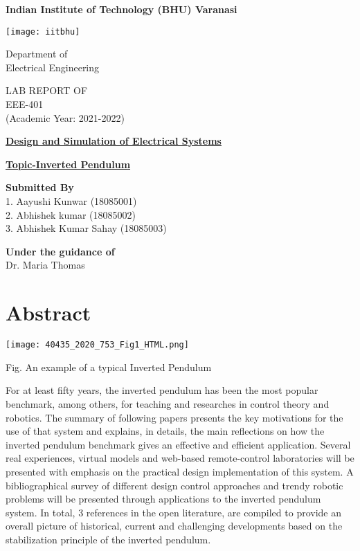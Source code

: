 \documentclass[11pt]{article}
\begin{document}
\begin{center}
{\huge \textbf{Indian Institute of Technology (BHU) Varanasi}}
\end{center}
\begin{center}
\texttt{[image: iitbhu]}
\end{center}
\begin{center}
{\LARGE Department of\\
Electrical Engineering\\
}
\end{center}
\begin{center}
    {\large LAB REPORT OF\\
    EEE-401\\ 
    (Academic Year: 2021-2022)\\}
\end{center}

\begin{center}
\textbf{\underline{Design and Simulation of Electrical Systems}}
\end{center}
\begin{center}
\textbf{\underline{Topic-Inverted Pendulum}}
\end{center}
\begin{center}
    \textbf{Submitted By}\\
    1. Aayushi Kunwar (18085001)\\
    2. Abhishek kumar (18085002)\\
    3. Abhishek Kumar Sahay (18085003)\\
\end{center}
\begin{center}
    \textbf{Under the guidance of}\\
    Dr. Maria Thomas
\end{center}

\newpage
\section{Abstract}
\begin{center}
    \texttt{[image: 40435\_2020\_753\_Fig1\_HTML.png]}
\end{center}
\begin{center}
    Fig. An example of a typical Inverted Pendulum
\end{center}
{For at least fifty years, the inverted pendulum has been the most popular benchmark, among others, for teaching and researches in control theory and robotics. The summary of following papers presents the key motivations for the use of that system and explains, in details, the main reflections on how the inverted pendulum benchmark gives an effective and efficient application. Several real experiences, virtual models and web-based remote-control laboratories will be presented with emphasis on the practical design implementation of this system. A bibliographical survey of different design control approaches and trendy robotic problems will be presented through applications to the inverted pendulum system. In total, 3 references in the open literature, are compiled to provide an overall picture of historical, current and challenging developments based on the stabilization principle of the inverted pendulum.}
\end{document}
